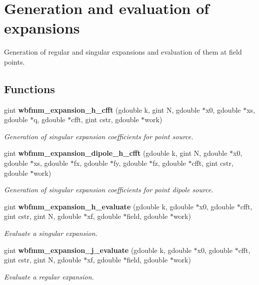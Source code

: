 \section{Generation and evaluation of expansions}
\label{group__expansions}


Generation of regular and singular expansions and evaluation of them at field points.  


\subsection*{Functions}
\begin{DoxyCompactItemize}
\item 
gint \textbf{ wbfmm\+\_\+expansion\+\_\+h\+\_\+cfft} (gdouble k, gint N, gdouble $\ast$x0, gdouble $\ast$xs, gdouble $\ast$q, gdouble $\ast$cfft, gint cstr, gdouble $\ast$work)
\begin{DoxyCompactList}\small\item\em Generation of singular expansion coefficients for point source. \end{DoxyCompactList}\item 
gint \textbf{ wbfmm\+\_\+expansion\+\_\+dipole\+\_\+h\+\_\+cfft} (gdouble k, gint N, gdouble $\ast$x0, gdouble $\ast$xs, gdouble $\ast$fx, gdouble $\ast$fy, gdouble $\ast$fz, gdouble $\ast$cfft, gint cstr, gdouble $\ast$work)
\begin{DoxyCompactList}\small\item\em Generation of singular expansion coefficients for point dipole source. \end{DoxyCompactList}\item 
gint \textbf{ wbfmm\+\_\+expansion\+\_\+h\+\_\+evaluate} (gdouble k, gdouble $\ast$x0, gdouble $\ast$cfft, gint cstr, gint N, gdouble $\ast$xf, gdouble $\ast$field, gdouble $\ast$work)
\begin{DoxyCompactList}\small\item\em Evaluate a singular expansion. \end{DoxyCompactList}\item 
gint \textbf{ wbfmm\+\_\+expansion\+\_\+j\+\_\+evaluate} (gdouble k, gdouble $\ast$x0, gdouble $\ast$cfft, gint cstr, gint N, gdouble $\ast$xf, gdouble $\ast$field, gdouble $\ast$work)
\begin{DoxyCompactList}\small\item\em Evaluate a regular expansion. \end{DoxyCompactList}\item 

\end{DoxyCompactItemize}
